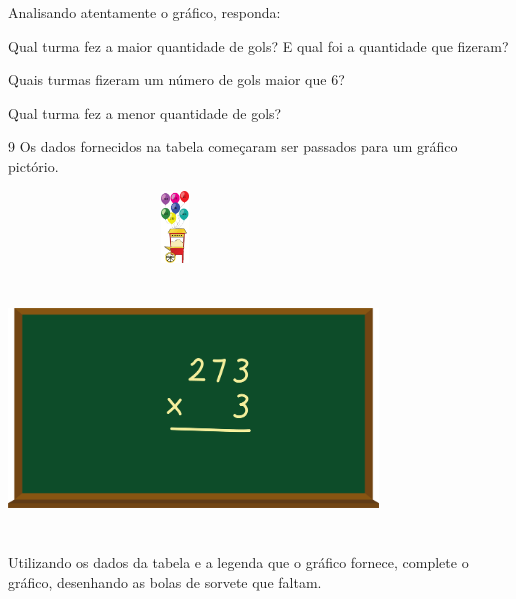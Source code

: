 {\begin{escolha}
{Analisando atentamente o gráfico, responda:

\begin{escolha}

\item
  Qual turma fez a maior quantidade de gols? E qual foi a quantidade que
  fizeram?

\item
  Quais turmas fizeram um número de gols maior que 6?

\item
  Qual turma fez a menor quantidade de gols?
\end{escolha}

\num{9} Os dados fornecidos na tabela começaram ser passados para um
gráfico pictório.


\includegraphics[width=3.47436in,height=0.75022in]{media/image98.png}

\includegraphics[width=3.86538in,height=2.63899in]{media/image99.png}

Utilizando os dados da tabela e a legenda que o gráfico fornece,
complete o gráfico, desenhando as bolas de sorvete que faltam.

}
\end{escolha}}
